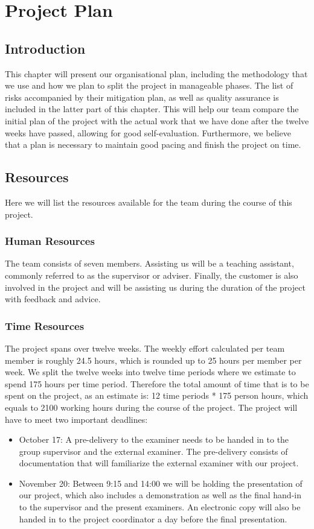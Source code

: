 \documentclass[../document.tex]{subfiles}
\begin{document}
\section{Project Plan}
\subsection{Introduction}
This chapter will present our organisational plan, including the methodology that we use and how we plan to split the project in manageable phases. The list of risks accompanied by their mitigation plan, as well as quality assurance is included in the latter part of this chapter. This will help our team compare the initial plan of the project with the actual work that we have done after the twelve weeks have passed, allowing for good self-evaluation. Furthermore, we believe that a plan is necessary to maintain good pacing and finish the project on time.

\subsection{Resources}
Here we will list the resources available for the team during the course of this project.

\subsubsection{Human Resources}
The team consists of seven members. Assisting us will be a teaching assistant, commonly referred to as the supervisor or adviser. Finally, the customer is also involved in the project and will be assisting us during the duration of the project with feedback and advice.

\subsubsection{Time Resources}
The project spans over twelve weeks. The weekly effort calculated per team member is roughly 24.5 hours, which is rounded up to 25 hours per member per week. We split the twelve weeks into twelve time periods where we estimate to spend 175 hours per time period. Therefore the total amount of time that is to be spent on the project, as an estimate  is: 12 time periods * 175 person hours, which equals to 2100 working hours during the course of the project.
\newpage
The project will have to meet two important deadlines:
\begin{itemize}
\item
October 17: A pre-delivery to the examiner needs to be handed in to the group supervisor and the external examiner. The pre-delivery consists of documentation that will familiarize the external examiner with our project.
\item
November 20: Between 9:15 and 14:00 we will be holding the presentation of our project, which also includes a demonstration as well as the final hand-in to the supervisor and the present examiners. An electronic copy will also be handed in to the project coordinator a day before the final presentation.
\end{itemize}
\end{document}

